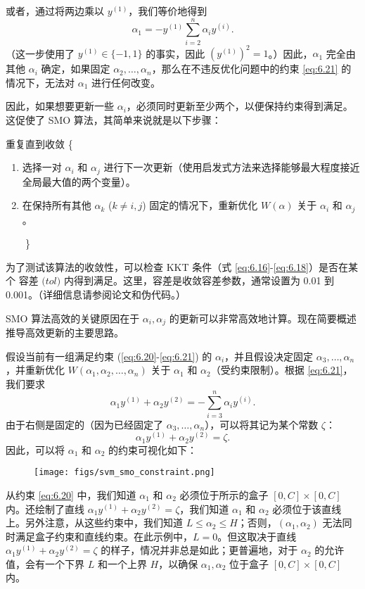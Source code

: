 或者，通过将两边乘以 $y^{(1)}$，我们等价地得到
\[
    \alpha_1 = -y^{(1)} \sum_{i=2}^n \alpha_i y^{(i)}.
\]
（这一步使用了 $y^{(1)} \in \{-1, 1\}$ 的事实，因此 $(y^{(1)})^2 = 1$。）因此，$\alpha_1$ 完全由其他 $\alpha_i$ 确定，如果固定 $\alpha_2, \dots, \alpha_n$，那么在不违反优化问题中的约束 \eqref{eq:6.21} 的情况下，无法对 $\alpha_1$ 进行任何改变。

因此，如果想要更新一些 $\alpha_i$，必须同时更新至少两个，以便保持约束得到满足。这促使了 SMO 算法，其简单来说就是以下步骤：

\begin{samepage}
重复直到收敛 \{
\vspace{-0.5em}
\begin{enumerate}
\setlength{\itemindent}{2em}
    \item 选择一对 $\alpha_i$ 和 $\alpha_j$ 进行下一次更新（使用启发式方法来选择能够最大程度接近全局最大值的两个变量）。
    \item 在保持所有其他 $\alpha_k$ ($k \ne i, j$) 固定的情况下，重新优化 $W(\alpha)$ 关于 $\alpha_i$ 和 $\alpha_j$。
\end{enumerate}
$\quad\quad$\}
\end{samepage}

为了测试该算法的收敛性，可以检查 KKT 条件（式 \eqref{eq:6.16}-\eqref{eq:6.18}）是否在某个 $\textit{容差 (tol)}$ 内得到满足。这里，容差是收敛容差参数，通常设置为 0.01 到 0.001。（详细信息请参阅论文和伪代码。）

SMO 算法高效的关键原因在于 $\alpha_i, \alpha_j$ 的更新可以非常高效地计算。现在简要概述推导高效更新的主要思路。

假设当前有一组满足约束 (\eqref{eq:6.20}-\eqref{eq:6.21}) 的 $\alpha_i$，并且假设决定固定 $\alpha_3, \dots, \alpha_n$，并重新优化 $W(\alpha_1, \alpha_2, \dots, \alpha_n)$ 关于 $\alpha_1$ 和 $\alpha_2$（受约束限制）。根据 \eqref{eq:6.21}，我们要求
\[
    \alpha_1 y^{(1)} + \alpha_2 y^{(2)} = - \sum_{i=3}^n \alpha_i y^{(i)}.
\]
由于右侧是固定的（因为已经固定了 $\alpha_3, \dots, \alpha_n$），可以将其记为某个常数 $\zeta$：
\begin{equation}
    \alpha_1 y^{(1)} + \alpha_2 y^{(2)} = \zeta. \label{eq:6.22}
\end{equation}
因此，可以将 $\alpha_1$ 和 $\alpha_2$ 的约束可视化如下：

\begin{figure}[H]
    \centering
    \texttt{[image: figs/svm\_smo\_constraint.png]}
\end{figure}

从约束 \eqref{eq:6.20} 中，我们知道 $\alpha_1$ 和 $\alpha_2$ 必须位于所示的盒子 $[0, C] \times [0, C]$ 内。还绘制了直线 $\alpha_1 y^{(1)} + \alpha_2 y^{(2)} = \zeta$，我们知道 $\alpha_1$ 和 $\alpha_2$ 必须位于该直线上。另外注意，从这些约束中，我们知道 $L \le \alpha_2 \le H$；否则，$(\alpha_1, \alpha_2)$ 无法同时满足盒子约束和直线约束。在此示例中，$L=0$。但这取决于直线 $\alpha_1 y^{(1)} + \alpha_2 y^{(2)} = \zeta$ 的样子，情况并非总是如此；更普遍地，对于 $\alpha_2$ 的允许值，会有一个下界 $L$ 和一个上界 $H$，以确保 $\alpha_1, \alpha_2$ 位于盒子 $[0, C] \times [0, C]$ 内。


